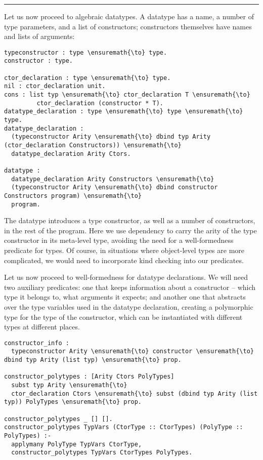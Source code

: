 \begin{center}\rule{0.5\linewidth}{\linethickness}\end{center}

Let us now proceed to algebraic datatypes. A datatype has a name, a
number of type parameters, and a list of constructors; constructors
themselves have names and lists of arguments:

\begin{verbatim}
typeconstructor : type \ensuremath{\to} type.
constructor : type.

ctor_declaration : type \ensuremath{\to} type.
nil : ctor_declaration unit.
cons : list typ \ensuremath{\to} ctor_declaration T \ensuremath{\to}
         ctor_declaration (constructor * T).
datatype_declaration : type \ensuremath{\to} type \ensuremath{\to} type.
datatype_declaration : 
  (typeconstructor Arity \ensuremath{\to} dbind typ Arity (ctor_declaration Constructors)) \ensuremath{\to}
  datatype_declaration Arity Ctors.

datatype :
  datatype_declaration Arity Constructors \ensuremath{\to}
  (typeconstructor Arity \ensuremath{\to} dbind constructor Constructors program) \ensuremath{\to}
  program.
\end{verbatim}

The datatype introduces a type constructor, as well as a number of
constructors, in the rest of the program. Here we use dependency to
carry the arity of the type constructor in its meta-level type, avoiding
the need for a well-formedness predicate for types. Of course, in
situations where object-level types are more complicated, we would need
to incorporate kind checking into our predicates.

Let us now proceed to well-formedness for datatype declarations. We will
need two auxiliary predicates: one that keeps information about a
constructor -- which type it belongs to, what arguments it expects; and
another one that abstracts over the type variables used in the datatype
declaration, creating a polymorphic type for the type of the
constructor, which can be instantiated with different types at different
places.

\begin{verbatim}
constructor_info :
  typeconstructor Arity \ensuremath{\to} constructor \ensuremath{\to} dbind typ Arity (list typ) \ensuremath{\to} prop.

constructor_polytypes : [Arity Ctors PolyTypes]
  subst typ Arity \ensuremath{\to}
  ctor_declaration Ctors \ensuremath{\to} subst (dbind typ Arity (list typ)) PolyTypes \ensuremath{\to} prop.

constructor_polytypes _ [] [].
constructor_polytypes TypVars (CtorType :: CtorTypes) (PolyType :: PolyTypes) :-
  applymany PolyType TypVars CtorType,
  constructor_polytypes TypVars CtorTypes PolyTypes.
\end{verbatim}

